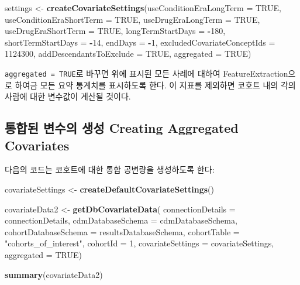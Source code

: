 \documentclass[10.5pt]{book}
\newenvironment{Shaded}{\begin{snugshade}}{\end{snugshade}}
\newcommand{\KeywordTok}[1]{\textcolor[rgb]{0.13,0.29,0.53}{\textbf{#1}}}
\newcommand{\DataTypeTok}[1]{\textcolor[rgb]{0.13,0.29,0.53}{#1}}
\newcommand{\DecValTok}[1]{\textcolor[rgb]{0.00,0.00,0.81}{#1}}
\newcommand{\StringTok}[1]{\textcolor[rgb]{0.31,0.60,0.02}{#1}}
\newcommand{\OtherTok}[1]{\textcolor[rgb]{0.56,0.35,0.01}{#1}}
\newcommand{\OperatorTok}[1]{\textcolor[rgb]{0.81,0.36,0.00}{\textbf{#1}}}
\newcommand{\NormalTok}[1]{#1}
\theoremstyle{definition}
\theoremstyle{definition}
\theoremstyle{definition}
\theoremstyle{remark}
\let\BeginKnitrBlock\begin \let\EndKnitrBlock\end
\begin{document}
\begin{Shaded}
\begin{Highlighting}[]
\NormalTok{settings <-}\StringTok{ }\KeywordTok{createCovariateSettings}\NormalTok{(}\DataTypeTok{useConditionEraLongTerm =} \OtherTok{TRUE}\NormalTok{,}
                                    \DataTypeTok{useConditionEraShortTerm =} \OtherTok{TRUE}\NormalTok{,}
                                    \DataTypeTok{useDrugEraLongTerm =} \OtherTok{TRUE}\NormalTok{,}
                                    \DataTypeTok{useDrugEraShortTerm =} \OtherTok{TRUE}\NormalTok{,}
                                    \DataTypeTok{longTermStartDays =} \OperatorTok{-}\DecValTok{180}\NormalTok{,}
                                    \DataTypeTok{shortTermStartDays =} \OperatorTok{-}\DecValTok{14}\NormalTok{,}
                                    \DataTypeTok{endDays =} \OperatorTok{-}\DecValTok{1}\NormalTok{,}
                                    \DataTypeTok{excludedCovariateConceptIds =} \DecValTok{1124300}\NormalTok{,}
                                    \DataTypeTok{addDescendantsToExclude =} \OtherTok{TRUE}\NormalTok{,}
                                    \DataTypeTok{aggregated =} \OtherTok{TRUE}\NormalTok{)}
\end{Highlighting}
\end{Shaded}

\BeginKnitrBlock{rmdimportant}
\texttt{aggregated\ =\ TRUE}로 바꾸면 위에 표시된 모든 사례에 대하여
FeatureExtraction으로 하여금 모든 요약 통계치를 표시하도록 한다. 이
지표를 제외하면 코호트 내의 각의 사람에 대한 변수값이 계산될 것이다.
\EndKnitrBlock{rmdimportant}

\subsection{통합된 변수의 생성 Creating Aggregated
Covariates}\label{---creating-aggregated-covariates}

다음의 코드는 코호트에 대한 통합 공변량을 생성하도록 한다:

\begin{Shaded}
\begin{Highlighting}[]
\NormalTok{covariateSettings <-}\StringTok{ }\KeywordTok{createDefaultCovariateSettings}\NormalTok{()}

\NormalTok{covariateData2 <-}\StringTok{ }\KeywordTok{getDbCovariateData}\NormalTok{(}
  \DataTypeTok{connectionDetails =}\NormalTok{ connectionDetails,}
  \DataTypeTok{cdmDatabaseSchema =}\NormalTok{ cdmDatabaseSchema,}
  \DataTypeTok{cohortDatabaseSchema =}\NormalTok{ resultsDatabaseSchema,}
  \DataTypeTok{cohortTable =} \StringTok{"cohorts_of_interest"}\NormalTok{,}
  \DataTypeTok{cohortId =} \DecValTok{1}\NormalTok{,}
  \DataTypeTok{covariateSettings =}\NormalTok{ covariateSettings,}
  \DataTypeTok{aggregated =} \OtherTok{TRUE}\NormalTok{)}

\KeywordTok{summary}\NormalTok{(covariateData2)}
\end{Highlighting}
\end{Shaded}
\end{document}
